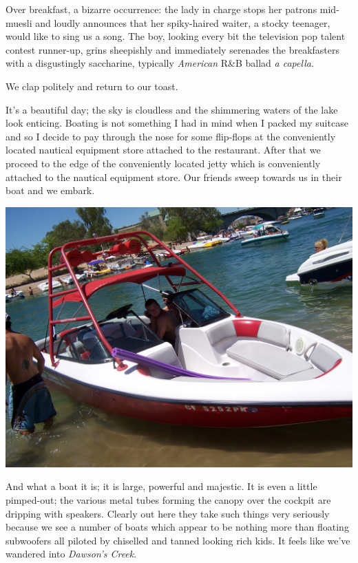 \documentclass[a5paper,titlepage,11pt]{book}
\begin{document}
Over breakfast, a bizarre occurrence:  the lady in charge stops her patrons mid-muesli and loudly announces that her spiky-haired waiter, a stocky teenager, would like to sing us a song.  The boy, looking every bit the television pop talent contest runner-up, grins sheepishly and immediately serenades the breakfasters with a disgustingly saccharine, typically \emph{American} R\&B ballad \emph{a capella}.

We clap politely and return to our toast.

It's a beautiful day; the sky is cloudless and the shimmering waters of the lake look enticing.  Boating is not something I had in mind when I packed my suitcase and so I decide to pay through the nose for some flip-flops at the conveniently located nautical equipment store attached to the restaurant.  After that we proceed to the edge of the conveniently located jetty which is conveniently attached to the nautical equipment store.  Our friends sweep towards us in their boat and we embark.

\begin{center}\includegraphics[width=\textwidth]{gfx/100_1606}\end{center}

And what a boat it is; it is large, powerful and majestic.  It is even a little pimped-out; the various metal tubes forming the canopy over the cockpit are dripping with speakers.  Clearly out here they take such things very seriously because we see a number of boats which appear to be nothing more than floating subwoofers all piloted by chiselled and tanned looking rich kids.  It feels like we've wandered into \emph{Dawson's Creek}.
\end{document}
